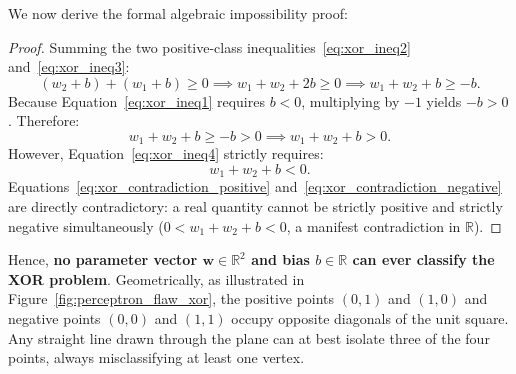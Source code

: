 We now derive the formal algebraic impossibility proof:
\begin{proof}
Summing the two positive-class inequalities~\eqref{eq:xor_ineq2} and~\eqref{eq:xor_ineq3}:
\begin{equation}
(w_2 + b) + (w_1 + b) \ge 0 \implies w_1 + w_2 + 2b \ge 0 \implies w_1 + w_2 + b \ge -b.
\end{equation}
Because Equation~\eqref{eq:xor_ineq1} requires $b < 0$, multiplying by $-1$ yields $-b > 0$. Therefore:
\begin{equation}
w_1 + w_2 + b \ge -b > 0 \implies w_1 + w_2 + b > 0.
\label{eq:xor_contradiction_positive}
\end{equation}
However, Equation~\eqref{eq:xor_ineq4} strictly requires:
\begin{equation}
w_1 + w_2 + b < 0.
\label{eq:xor_contradiction_negative}
\end{equation}
Equations~\eqref{eq:xor_contradiction_positive} and~\eqref{eq:xor_contradiction_negative} are directly contradictory: a real quantity cannot be strictly positive and strictly negative simultaneously ($0 < w_1 + w_2 + b < 0$, a manifest contradiction in $\mathbb{R}$).
\end{proof}

Hence, \textbf{no parameter vector $\mathbf{w} \in \mathbb{R}^2$ and bias $b \in \mathbb{R}$ can ever classify the XOR problem}. Geometrically, as illustrated in Figure~\ref{fig:perceptron_flaw_xor}, the positive points $(0, 1)$ and $(1, 0)$ and negative points $(0, 0)$ and $(1, 1)$ occupy opposite diagonals of the unit square. Any straight line drawn through the plane can at best isolate three of the four points, always misclassifying at least one vertex.

